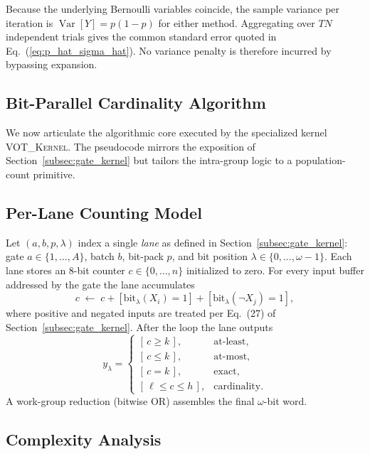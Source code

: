 Because the underlying Bernoulli variables coincide, the sample variance per
iteration is
\(
  \operatorname{Var}[Y] = p(1-p)
\)
for either method.  Aggregating over $T N$ independent trials gives the common
standard error quoted in Eq.~(\ref{eq:p_hat_sigma_hat}).  No variance penalty
is therefore incurred by bypassing expansion.

\subsection{Bit-Parallel Cardinality Algorithm}
\label{sec:card_algorithm}

We now articulate the algorithmic core executed by the specialized kernel
\textsc{VOT\_Kernel}.  The pseudocode mirrors the exposition of
Section~\ref{subsec:gate_kernel} but tailors the intra-group logic to a
population-count primitive.

\subsection{Per-Lane Counting Model}

Let $(a,b,p,\lambda)$ index a single \emph{lane} as defined in
Section~\ref{subsec:gate_kernel}: gate $a\in\{1,\dots,A\}$, batch $b$, bit-pack
$p$, and bit position $\lambda\in\{0,\dots,\omega-1\}$.  Each lane stores an
8-bit counter $c\in\{0,\dots,n\}$ initialized to zero.  For every input buffer
addressed by the gate the lane accumulates
\[
  c\;\leftarrow\;c + [\text{bit}_{\lambda}(X_i)=1] + [\text{bit}_{\lambda}(\lnot X_j)=1],
\]
where positive and negated inputs are treated per
Eq.~(27) of Section~\ref{subsec:gate_kernel}.  After the loop the lane outputs
\[
  y_{\lambda} =
    \begin{cases}
      [\,c \ge k\,], & \text{at-least},\\
      [\,c \le k\,], & \text{at-most},\\
      [\,c = k\,],   & \text{exact},\\[4pt]
      [\,\ell \le c \le h\,], & \text{cardinality}.
    \end{cases}
\]
A work-group reduction (bitwise OR) assembles the final $\omega$-bit word.

\subsection{Complexity Analysis}
\label{sec:voter_complexity}

